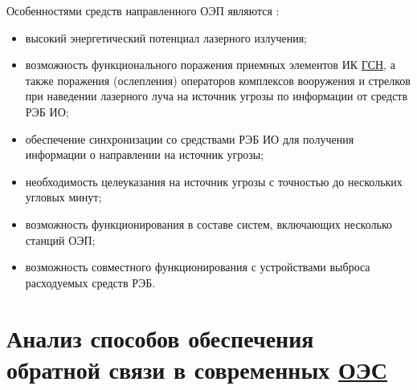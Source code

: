 Особенностями средств направленного ОЭП являются \cite[]{ForeignMilitary}:
\begin{itemize}
	\item высокий энергетический потенциал лазерного излучения;
	\item возможность функционального поражения приемных элементов ИК \hyperref[acroGSN]{ГСН}, а также поражения (ослепления) операторов комплексов вооружения и стрелков при наведении лазерного луча на источник угрозы по информации от средств РЭБ ИО;
	\item обеспечение синхронизации со средствами РЭБ ИО для получения информации о направлении на источник угрозы;
	\item необходимость целеуказания на источник угрозы с точностью до нескольких угловых минут;
	\item возможность функционирования в составе систем, включающих несколько станций ОЭП;
	\item возможность совместного функционирования с устройствами выброса расходуемых средств РЭБ.
\end{itemize}



\section{Анализ способов обеспечения обратной связи в современных  \hyperref[acroEOS]{ОЭС}} \label{sec:ch1/sec3-}

